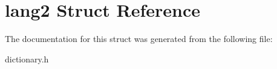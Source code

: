 \hypertarget{structlang2}{
\section{lang2 Struct Reference}
\label{structlang2}
}


The documentation for this struct was generated from the following file:\begin{DoxyCompactItemize}
\item 
dictionary.h\end{DoxyCompactItemize}
